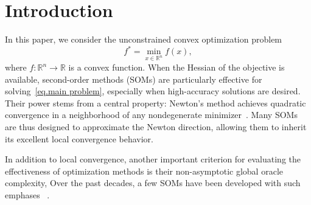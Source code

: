 \documentclass[moor,sglanonrev]{informs4}
\begin{document}




\maketitle


\section{Introduction}\label{Intro}
In this paper, we consider the unconstrained convex optimization problem
\begin{equation} \label{eq.main problem}
    f^* = \min_{x\in \mathbb{R}^n} f(x),
\end{equation}
where $f:\mathbb{R}^n \to \mathbb{R}$ is a convex function.
When the Hessian of the objective is available, second-order methods (SOMs) are particularly effective for solving~\eqref{eq.main problem}, especially when high-accuracy solutions are desired. Their power stems from a central property: Newton’s method achieves quadratic convergence in a neighborhood of any nondegenerate minimizer~\cite{polyak2007newton,more1982newton,nocedal1999numerical}. Many SOMs are thus designed to approximate the Newton direction, allowing them to inherit its excellent local convergence behavior.

In addition to local convergence, another important criterion for evaluating the effectiveness of optimization methods is their non-asymptotic global oracle complexity,   Over the past decades, a few SOMs have been developed with such emphases ~\cite{nesterov2006cubic,mishchenko2023regularized,jiang2026beyond,he2025homogeneous,curtis2021trust,he2023newton,cartis2011adaptive,cartis2011adaptive_i,curtis2017trust}.
\end{document}
